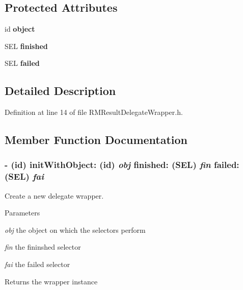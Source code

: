 \subsection*{Protected Attributes}
\begin{DoxyCompactItemize}
\item 
\hypertarget{interface_r_m_result_delegate_wrapper_aa1b393d480ecc76d9c61a2d92e40f43b}{
id {\bfseries object}}
\label{interface_r_m_result_delegate_wrapper_aa1b393d480ecc76d9c61a2d92e40f43b}

\item 
\hypertarget{interface_r_m_result_delegate_wrapper_ab76af46c7806a6326825e7522566b88b}{
SEL {\bfseries finished}}
\label{interface_r_m_result_delegate_wrapper_ab76af46c7806a6326825e7522566b88b}

\item 
\hypertarget{interface_r_m_result_delegate_wrapper_a185cef2e8baa22a03244509286ed820d}{
SEL {\bfseries failed}}
\label{interface_r_m_result_delegate_wrapper_a185cef2e8baa22a03244509286ed820d}

\end{DoxyCompactItemize}


\subsection{Detailed Description}


Definition at line 14 of file RMResultDelegateWrapper.h.

\subsection{Member Function Documentation}
\hypertarget{interface_r_m_result_delegate_wrapper_ab2fbcbd604edd4ca182125604fecc51e}{
\subsubsection[{initWithObject:finished:failed:}]{\setlength{\rightskip}{0pt plus 5cm}-\/ (id) initWithObject: (id) {\em obj}\/ finished: (SEL) {\em fin}\/ failed: (SEL) {\em fai}}}
\label{interface_r_m_result_delegate_wrapper_ab2fbcbd604edd4ca182125604fecc51e}


Create a new delegate wrapper. 
\begin{DoxyParams}{Parameters}
\item[{\em obj}]the object on which the selectors perform \item[{\em fin}]the fininshed selector \item[{\em fai}]the failed selector \end{DoxyParams}
\begin{DoxyReturn}{Returns}
the wrapper instance 
\end{DoxyReturn}


